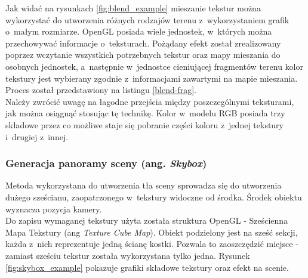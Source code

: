 \documentclass[a4paper,twoside,12pt]{book}
\newcommand{\obcy}[1]{\emph{#1}}
\newcommand{\ang}[1]{{\selectlanguage{british}\obcy{#1}}}
\begin{document}
Jak widać na rysunkach \ref{fig:blend_example} mieszanie tekstur można wykorzystać do utworzenia różnych rodzajów terenu z~wykorzystaniem grafik o~małym rozmiarze. OpenGL posiada wiele jednostek, w~których można przechowywać informacje o~teksturach. Pożądany efekt został zrealizowany poprzez wczytanie wszystkich potrzebnych tekstur oraz mapy mieszania do osobnych jednostek, a~następnie w~jednostce cieniującej fragmentów terenu kolor tekstury jest wybierany zgodnie z~informacjami zawartymi na mapie mieszania. Proces został przedstawiony na listingu \ref{blend-frag}. \\
Należy zwrócić uwagę na łagodne przejścia między poszczególnymi teksturami, jak można osiągnąć stosując tę technikę. Kolor w~modelu RGB posiada trzy składowe przez co możliwe staje się pobranie części koloru z~jednej tekstury i~drugiej z~innej.



\subsubsection{Generacja panoramy sceny (ang. \ang{Skybox})}
Metoda wykorzystana do utworzenia tła sceny sprowadza się do utworzenia dużego sześcianu, zaopatrzonego w~tekstury widoczne od środka. Środek obiektu wyznacza pozycja kamery. \\
Do zapisu wymaganej tekstury użyta została struktura OpenGL - Sześcienna Mapa Tekstury (ang \ang{Texture Cube Map}). Obiekt podzielony jest na sześć sekcji, każda z~nich reprezentuje jedną ścianę kostki. Pozwala to zaoszczędzić miejsce - zamiast sześciu tekstur została wykorzystana tylko jedna. Rysunek \ref{fig:skybox_example} pokazuje grafiki składowe tekstury oraz efekt na scenie.
\end{document}
